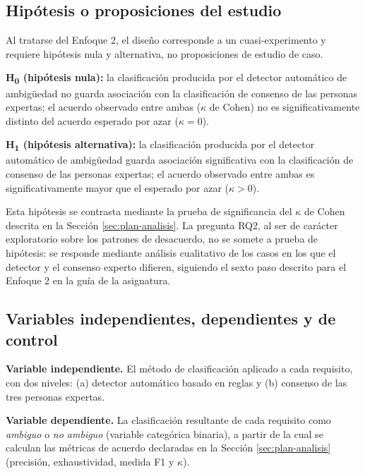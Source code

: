 \documentclass[journal,onecolumn]{IEEEtran}
\begin{document}
	\subsection{Hipótesis o proposiciones del estudio}
	\label{sec:hipotesis}
	
	Al tratarse del Enfoque 2, el diseño corresponde a un cuasi-experimento y
	requiere hipótesis nula y alternativa, no proposiciones de estudio de caso.
	
	\textbf{H\textsubscript{0} (hipótesis nula):} la clasificación producida
	por el detector automático de ambigüedad no guarda asociación con la
	clasificación de consenso de las personas expertas; el acuerdo observado
	entre ambas ($\kappa$ de Cohen) no es significativamente distinto del
	acuerdo esperado por azar ($\kappa = 0$).
	
	\textbf{H\textsubscript{1} (hipótesis alternativa):} la clasificación
	producida por el detector automático de ambigüedad guarda asociación
	significativa con la clasificación de consenso de las personas expertas;
	el acuerdo observado entre ambas es significativamente mayor que el
	esperado por azar ($\kappa > 0$).
	
	Esta hipótesis se contrasta mediante la prueba de significancia del
	$\kappa$ de Cohen descrita en la Sección \ref{sec:plan-analisis}. La
	pregunta RQ2, al ser de carácter exploratorio sobre los patrones de
	desacuerdo, no se somete a prueba de hipótesis: se responde mediante
	análisis cualitativo de los casos en los que el detector y el consenso
	experto difieren, siguiendo el sexto paso descrito para el Enfoque 2 en la
	guía de la asignatura.
	
	\subsection{Variables independientes, dependientes y de control}
	\label{sec:variables}
	
	\textbf{Variable independiente.} El método de clasificación aplicado a
	cada requisito, con dos niveles: (a) detector automático basado en reglas
	y (b) consenso de las tres personas expertas.
	
	\textbf{Variable dependiente.} La clasificación resultante de cada
	requisito como \emph{ambiguo} o \emph{no ambiguo} (variable categórica
	binaria), a partir de la cual se calculan las métricas de acuerdo
	declaradas en la Sección \ref{sec:plan-analisis} (precisión, exhaustividad,
	medida F1 y $\kappa$).
	
\end{document}
